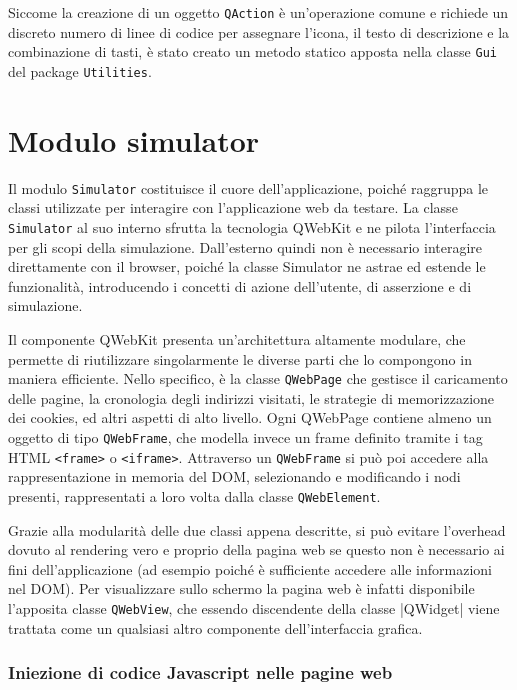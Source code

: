 Siccome la creazione di un oggetto \verb|QAction| è un'operazione comune e richiede un discreto numero di linee di codice per assegnare l'icona, il testo di descrizione e la combinazione di tasti, è stato creato un metodo statico apposta nella classe \verb|Gui| del package \verb|Utilities|.

\section{Modulo simulator}

Il modulo \verb|Simulator| costituisce il cuore dell'applicazione, poiché raggruppa le classi utilizzate per interagire con l'applicazione web da testare. La classe \verb|Simulator| al suo interno sfrutta la tecnologia QWebKit e ne pilota l'interfaccia per gli scopi della simulazione. Dall'esterno quindi non è necessario interagire direttamente con il browser, poiché la classe Simulator ne astrae ed estende le funzionalità, introducendo i concetti di azione dell'utente, di asserzione e di simulazione.

Il componente QWebKit presenta un'architettura altamente modulare, che permette di riutilizzare singolarmente le diverse parti che lo compongono in maniera efficiente. Nello specifico, è la classe \verb|QWebPage| che gestisce il caricamento delle pagine, la cronologia degli indirizzi visitati, le strategie di memorizzazione dei cookies, ed altri aspetti di alto livello. Ogni QWebPage contiene almeno un oggetto di tipo \verb|QWebFrame|, che modella invece un frame definito tramite i tag HTML \verb|<frame>| o \verb|<iframe>|. Attraverso un \verb|QWebFrame| si può poi accedere alla rappresentazione in memoria del DOM, selezionando e modificando i nodi presenti, rappresentati a loro volta dalla classe \verb|QWebElement|. 

Grazie alla modularità delle due classi appena descritte, si può evitare l'overhead dovuto al rendering vero e proprio della pagina web se questo non è necessario ai fini dell'applicazione (ad esempio poiché è sufficiente accedere alle informazioni nel DOM). Per visualizzare sullo schermo la pagina web è infatti disponibile l'apposita classe \verb|QWebView|, che essendo discendente della classe |QWidget| viene trattata come un qualsiasi altro componente dell'interfaccia grafica.

\subsubsection{Iniezione di codice Javascript nelle pagine web}

